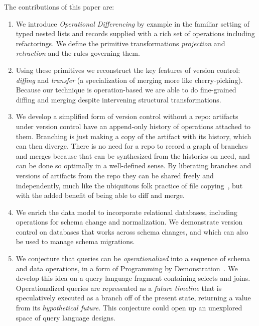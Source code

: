 \documentclass[english,submission]{programming}
\theoremstyle{definition}
\begin{document}
The contributions of this paper are:

\begin{enumerate}

\item We introduce \textit{Operational Differencing} by example in the familiar setting of typed nested lists and records supplied with a rich set of operations
including refactorings. We define the primitive transformations \textit{projection} and \textit{retraction} and the rules governing them.

\item Using these primitives we reconstruct the key features of version control: \textit{diffing} and \textit{transfer} (a specialization of merging more like cherry-picking). Because our technique is operation-based we are able to do fine-grained diffing and merging despite intervening structural transformations.

\item We develop a simplified form of version control without a repo: artifacts under version control have an append-only history of operations attached to them. Branching is just making a copy of the artifact with its history, which can then diverge. There is no need for a repo to record a graph of branches and merges because that can be synthesized from the histories on need, and can be done so optimally in a well-defined sense. By liberating branches and versions of artifacts from the repo they can be shared freely and independently, much like the ubiquitous folk practice of file copying~\cite{Burnett14, Basman19}, but with the added benefit of being able to diff and merge.

\item We enrich the data model to incorporate relational databases, including operations for schema change and normalization. We demonstrate version control on databases that works across schema changes, and which can also be used to manage schema migrations.

\item We conjecture that queries can be \textit{operationalized} into a sequence of schema and data operations, in a form of Programming by Demonstration~\cite{cypher93-pbd}. We develop this idea on a query language fragment containing selects and joins. Operationalized queries are represented as a \textit{future timeline} that is speculatively executed as a branch off of the present state, returning a value from its \textit{hypothetical future}. This conjecture could open up an unexplored space of query language designs.


\end{enumerate}
\end{document}
